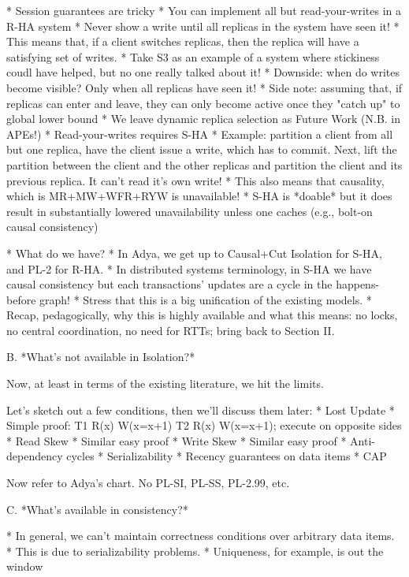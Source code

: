 * Session guarantees are tricky
	* You can implement all but read-your-writes in a R-HA system
		* Never show a write until all replicas in the system have seen it!
		* This means that, if a client switches replicas, then the replica will have a satisfying set of writes.
                * Take S3 as an example of a system where stickiness coudl have helped, but no one really talked about it!
		* Downside: when do writes become visible? Only when all replicas have seen it!
		* Side note: assuming that, if replicas can enter and leave, they can only become active once they "catch up" to global lower bound
			* We leave dynamic replica selection as Future Work (N.B. in APEs!)
	* Read-your-writes requires S-HA
		* Example: partition a client from all but one replica, have the client issue a write, which has to commit. Next, lift the partition between the client and the other replicas and partition the client and its previous replica. It can't read it's own write!
		* This also means that causality, which is MR+MW+WFR+RYW is unavailable!
		* S-HA is *doable* but it does result in substantially lowered unavailability unless one caches (e.g., bolt-on causal consistency)

* What do we have?
	* In Adya, we get up to Causal+Cut Isolation for S-HA, and PL-2 for R-HA.
	* In distributed systems terminology, in S-HA we have causal consistency but each transactions' updates are a cycle in the happens-before graph!
		* Stress that this is a big unification of the existing models.
	* Recap, pedagogically, why this is highly available and what this means: no locks, no central coordination, no need for RTTs; bring back to Section II.

B. *What's not available in Isolation?*

Now, at least in terms of the existing literature, we hit the limits.

Let's sketch out a few conditions, then we'll discuss them later:
* Lost Update
	* Simple proof: T1 R(x) W(x=x+1) T2 R(x) W(x=x+1); execute on opposite sides 
* Read Skew
	* Similar easy proof
* Write Skew
	* Similar easy proof
* Anti-dependency cycles
	* Serializability
* Recency guarantees on data items
	* CAP

Now refer to Adya's chart. No PL-SI, PL-SS, PL-2.99, etc.

C. *What's available in consistency?*

* In general, we can't maintain correctness conditions over arbitrary data items.
	* This is due to serializability problems.
	* Uniqueness, for example, is out the window

